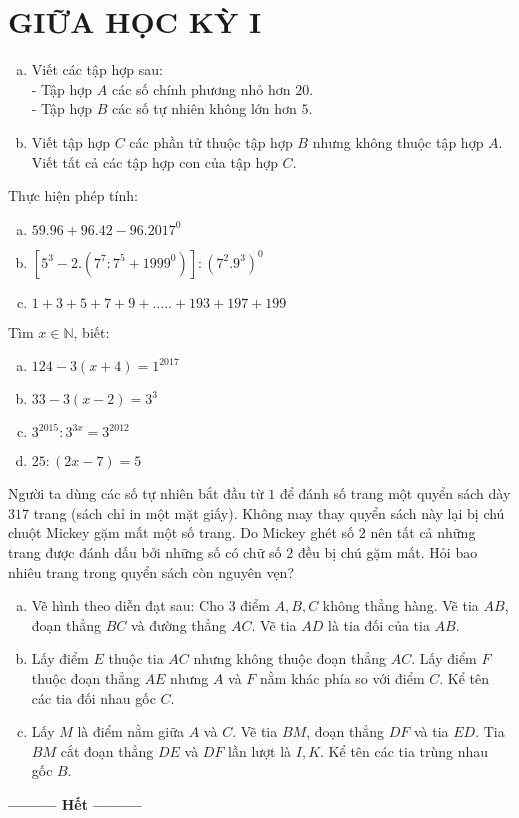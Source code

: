\section{GIỮA HỌC KỲ I}
\setcounter{ex}{0}
\begin{ex}
	\begin{enumerate}[a)]
				\item Viết các tập hợp sau:\\
				- Tập hợp $A$ các số chính phương nhỏ hơn $20$.\\
				- Tập hợp $B$ các số tự nhiên không lớn hơn $5$.
				\item Viết tập hợp $C$ các phần tử thuộc tập hợp $B$ nhưng không thuộc tập hợp $A$. Viết tất cả các tập hợp con của tập hợp $C$. 
	\end{enumerate}
\end{ex}   \begin{ex} Thực hiện phép tính:
			\begin{enumerate}[a)]
			\item $59.96 + 96.42 - 96.2017^0$
			\item $\left[ {{5^3} - 2.\left( {{7^7}:{7^5} + {{1999}^0}} \right)} \right]:{\left( {{7^2}{{.9}^3}} \right)^0}$
			\item $1 + 3 + 5 + 7 + 9 + ..... + 193 + 197 + 199$
			\end{enumerate}
\end{ex}   \begin{ex} Tìm $x \in \mathbb{N}$, biết:
	\begin{enumerate}[a)]
			\item $124 - 3\left( {x + 4} \right) = {1^{2017}}$
			\item $33 - 3\left( {x - 2} \right) = {3^3}$
			\item ${3^{2015}}:{3^{3x}} = {3^{2012}}$
			\item $25:\left( {2x - 7} \right) = 5$
			\end{enumerate}
\end{ex}   \begin{ex} Người ta dùng các số tự nhiên bắt đầu từ $1$ để đánh số trang một quyển sách dày $317$ trang (sách chỉ in một mặt giấy). Không may thay quyển sách này lại bị chú chuột Mickey gặm mất một số trang. Do Mickey ghét số $2$ nên tất cả những trang được đánh dấu bởi những số có chữ số $2$ đều bị chú gặm mất. Hỏi bao nhiêu trang trong quyển sách còn nguyên vẹn? 
\end{ex}   \begin{ex} 
		\begin{enumerate}[a)]
				\item Vẽ hình theo diễn đạt sau: Cho $3$ điểm $A, B, C$ không thẳng hàng. Vẽ tia $AB$, đoạn thẳng $BC$ và đường thẳng $AC$. Vẽ tia $AD$ là tia đối của tia $AB$.
				\item Lấy điểm $E$ thuộc tia $AC$ nhưng không thuộc đoạn thẳng $AC$. Lấy điểm $F$ thuộc đoạn thẳng $AE$ nhưng $A$ và $F$ nằm khác phía so với điểm $C$. Kể tên các tia đối nhau gốc $C$.
				\item Lấy $M$ là điểm nằm giữa $A$ và $C$. Vẽ tia $BM$, đoạn thẳng $DF$ và tia $ED$. Tia $BM$ cắt đoạn thẳng $DE$ và $DF$ lần lượt là $I, K$. Kể tên các tia trùng nhau gốc $B$.
		\end{enumerate} 
\end{ex}
\begin{center}
	\textbf{\textbf{---------} Hết \textbf{---------}}
\end{center}